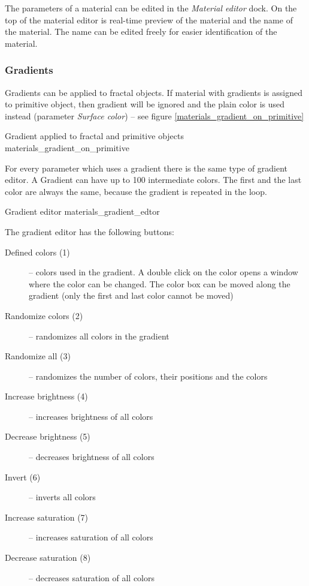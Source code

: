 The parameters of a material can be edited in the \emph{Material editor} dock. On the top of the material editor is real-time preview of the material and the name of the material. The name can be edited freely for easier identification of the material.

\subsubsection{Gradients}\label{materials-gradients}

Gradients can be applied to fractal objects. If material with gradients is assigned to primitive object, then gradient will be ignored and the plain color is used instead (parameter \emph{Surface color}) -- see figure \ref{materials_gradient_on_primitive}

{Gradient applied to fractal and primitive objects}
{materials_gradient_on_primitive}

For every parameter which uses a gradient there is the same type of gradient editor. A Gradient can have up to 100 intermediate colors. The first and the last color are always the same, because the gradient is repeated in the loop.

{Gradient editor}
{materials_gradient_edtor}

The gradient editor has the following buttons:
\nopagebreak
\begin{description}
	\item[Defined colors (1)] -- colors used in the gradient. A double click on the color opens a window where the color can be changed. The color box can be moved along the gradient (only the first and last color cannot be moved)
	\item[Randomize colors (2)] -- randomizes all colors in the gradient
	\item[Randomize all (3)] -- randomizes the number of colors, their positions and the colors
	\item[Increase brightness (4)] -- increases brightness of all colors
	\item[Decrease brightness (5)] -- decreases brightness of all colors
	\item[Invert (6)] -- inverts all colors
	\item[Increase saturation (7)] -- increases saturation of all colors
	\item[Decrease saturation (8)] -- decreases saturation of all colors
\end{description}

